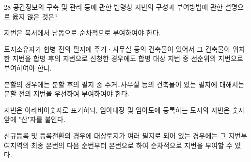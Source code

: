 \begin{question}{28}
공간정보의 구축 및 관리 등에 관한 법령상 지번의 구성과 부여방법에 관한 설명으로 옳지 않은 것은?
\begin{choices}
  \item 지번은 북서에서 남동으로 순차적으로 부여하여야 한다.
  \item 토지소유자가 합병 전의 필지에 주거ㆍ사무실 등의 건축물이 있어서 그 건축물이 위치한 지번을 합병 후의 지번으로 신청한 경우에도 합병 대상 지번 중 선순위의 지번으로 부여하여야 한다.
  \item 분할의 경우에는 분할 후의 필지 중 주거․사무실 등의 건축물이 있는 필지에 대해서는 분할 전의 지번을 우선하여 부여하여야 한다.
  \item 지번은 아라비아숫자로 표기하되, 임야대장 및 임야도에 등록하는 토지의 지번은 숫자 앞에 "산"자를 붙인다.
  \item 신규등록 및 등록전환의 경우에 대상토지가 여러 필지로 되어 있는 경우에는 그 지번부여지역의 최종 본번의 다음 순번부터 본번으로 하여 순차적으로 지번을 부여할 수 있다.
\end{choices}
\end{question}
